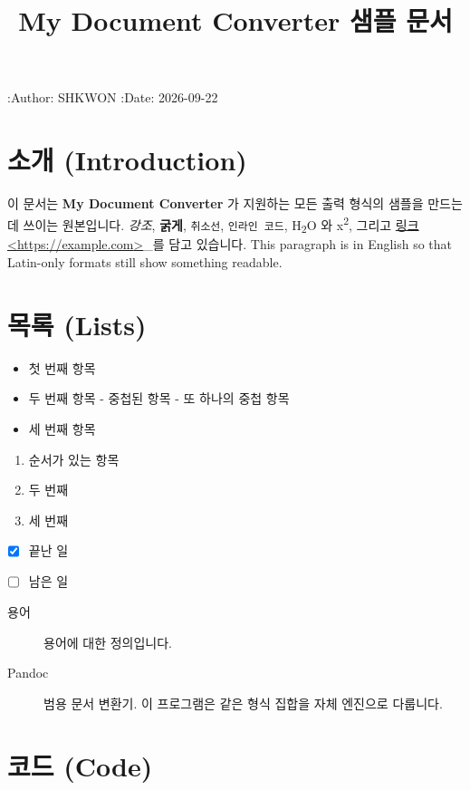 \documentclass[11pt]{article}
\title{My Document Converter 샘플 문서}
\date{}
\begin{document}
\maketitle

:Author: SHKWON
:Date: 2026-09-22

\section*{소개 (Introduction)}\label{소개-introduction}

이 문서는 \textbf{My Document Converter} 가 지원하는 모든 출력 형식의 샘플을 만드는 데 쓰이는
원본입니다.
\emph{강조}, \textbf{굵게}, \verb|취소선|, \verb|인라인 코드|, H\textsubscript{2}O 와
x\textsuperscript{2}, 그리고 \href{링크
<https://example.com>}{링크
<\url{https://example.com}>}\_를 담고 있습니다.
This paragraph is in English so that Latin-only formats still show
something readable.

\section*{목록 (Lists)}\label{목록-lists}

\begin{itemize}
\item 첫 번째 항목
\item 두 번째 항목
- 중첩된 항목
- 또 하나의 중첩 항목
\item 세 번째 항목
\end{itemize}

\begin{enumerate}
\item 순서가 있는 항목
\item 두 번째
\item 세 번째
\end{enumerate}

\begin{itemize}
\item ☒ 끝난 일
\item ☐ 남은 일
\end{itemize}

\begin{description}
\item[용어] 용어에 대한 정의입니다.
\item[Pandoc] 범용 문서 변환기. 이 프로그램은 같은 형식 집합을 자체 엔진으로 다룹니다.
\end{description}

\section*{코드 (Code)}\label{코드-code}
\end{document}
